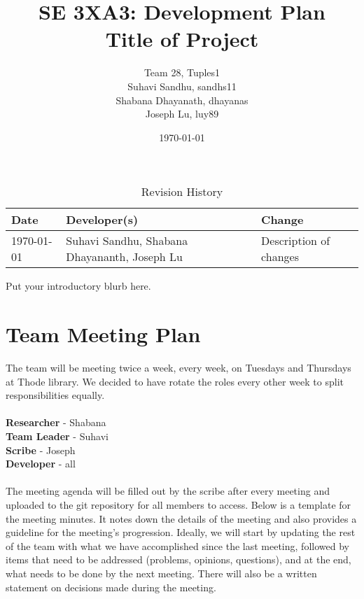 \documentclass{article}
\title{SE 3XA3: Development Plan\\Title of Project}
\author{Team 28, Tuples1
		\\ Suhavi Sandhu, sandhs11
		\\ Shabana Dhayanath, dhayanas
		\\ Joseph Lu, luy89
}
\date{\today}
\begin{document}
\begin{table}[hp]
\caption{Revision History} \label{TblRevisionHistory}
\begin{tabularx}{\textwidth}{llX}
\toprule
\textbf{Date} & \textbf{Developer(s)} & \textbf{Change}\\
\midrule
\today & Suhavi Sandhu, Shabana Dhayananth, Joseph Lu & Description of changes\\
\bottomrule
\end{tabularx}
\end{table}

\newpage

\maketitle

Put your introductory blurb here.

\section{Team Meeting Plan}
The team will be meeting twice a week, every week, on Tuesdays and Thursdays at Thode library. We decided to have rotate the roles every other week to split responsibilities equally.\\\\
\textbf{Researcher} - Shabana\\
\textbf{Team Leader} - Suhavi\\
\textbf{Scribe} - Joseph\\
\textbf{Developer} - all\\\\
The meeting agenda will be filled out by the scribe after every meeting and uploaded to the git repository for all members to access. Below is a template for the meeting minutes. It notes down the details of the meeting and also provides a guideline for the meeting’s progression. Ideally, we will start by updating the rest of the team with what we have accomplished since the last meeting, followed by items that need to be addressed (problems, opinions, questions), and at the end, what needs to be done by the next meeting. There will also be a written statement on decisions made during the meeting.
\end{document}
